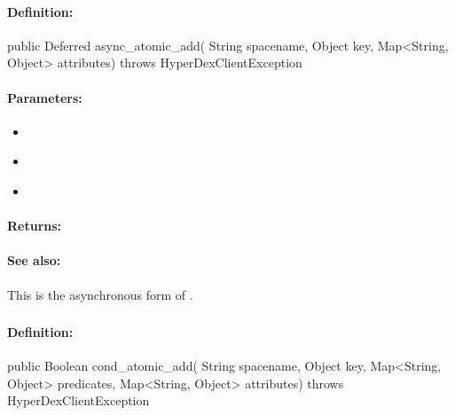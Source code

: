 \paragraph{Definition:}
\begin{javacode}
public Deferred async_atomic_add(
        String spacename,
        Object key,
        Map<String, Object> attributes) throws HyperDexClientException
\end{javacode}

\paragraph{Parameters:}
\begin{itemize}[noitemsep]
\item {}\\

\item {}\\

\item {}\\

\end{itemize}

\paragraph{Returns:}


\paragraph{See also:}  This is the asynchronous form of .

\pagebreak
\subsubsection{}
\label{api:java:cond_atomic_add}


\paragraph{Definition:}
\begin{javacode}
public Boolean cond_atomic_add(
        String spacename,
        Object key,
        Map<String, Object> predicates,
        Map<String, Object> attributes) throws HyperDexClientException
\end{javacode}

